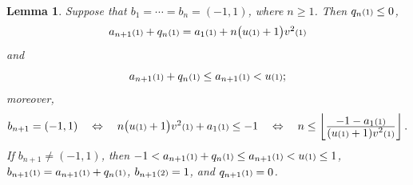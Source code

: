 \documentclass[12pt]{article}
\newtheorem{lemma}[theorem]{Lemma}
\newcommand{\kkk}[1]{\ensuremath{\textstyle\mathsmaller{({#1})}}}
\begin{document}
\begin{lemma}
\label{l:5}
Suppose that $b_1=\cdots = b_n = (-1,1)$, where $n\geq 1$. 
Then $q_n\kkk{1}\leq 0$, 
\begin{equation}
  \label{e:1911092am}
a_{n+1}\kkk{1}+q_n\kkk{1} = a_1\kkk{1}+n\big(u\kkk{1}+1\big)v^2\kkk{1}
\end{equation}
and 
\begin{equation}
  \label{e:191109c}
  a_{n+1}\kkk{1}+q_n\kkk{1}\leq a_{n+1}\kkk{1}<u\kkk{1};
\end{equation}
moreover, 
\begin{equation}
  \label{e:1911092am+}
b_{n+1} = (-1,1)
\quad
\Leftrightarrow
\quad
n\big(u\kkk{1}+1\big)v^2\kkk{1}+a_1\kkk{1}\leq -1
\quad
\Leftrightarrow
\quad
n\leq \left\lfloor \frac{\displaystyle -1-a_1\kkk{1}}{\displaystyle(u\kkk{1}+1)v^2\kkk{1}} \right\rfloor. 
\end{equation}
If $b_{n+1}\neq (-1,1)$, 
then 
$-1 < a_{n+1}\kkk{1} + q_n\kkk{1} \leq a_{n+1}\kkk{1}<u\kkk{1}\leq 1$,
$b_{n+1}\kkk{1} = a_{n+1}\kkk{1} + q_n\kkk{1}$, 
$b_{n+1}\kkk{2} = 1$, 
and
$q_{n+1}\kkk{1} = 0$. 
\end{lemma}
\end{document}
